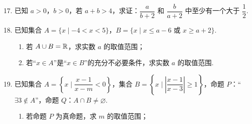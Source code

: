 \documentclass[a4paper,11pt]{article}
\begin{document}
\begin{enumerate}
\setcounter{enumi}{16}

\item 已知 $a>0$，$b>0$，若 $a+b>4$，求证：$\dfrac a{b+2}$ 和 $\dfrac b{a+2}$ 中至少有一个大于 $\dfrac12$.

\ifanswer
\solbegin
{}
\solend
\fi

\ansspace[6]

\item 已知集合 $A=\{x\mid-4<x<5\}$，$B=\{x\mid x\leqslant a-6\text{ 或 }x\geqslant a+2\}$.

\begin{enumerate}[label=(\arabic*)]

\item 若 $A\cup B=\mathbb{R}$，求实数 $a$ 的取值范围；

\item 若“$x\in A$”是“$x\in B$”的充分不必要条件，求实数 $a$ 的取值范围.

\end{enumerate}

\ifanswer
\solbegin
{}
\solend
\fi

\ansspace[8]

\item 已知集合 $A=\left\{x\mid\dfrac{x-1}{x-m}<0\right\}$，集合 $B=\left\{x\mid\left|\dfrac{x-1}{x-3}\right|\geqslant1\right\}$，命题 $P$：“$\exists3\notin A$”，命题
$Q$：$A\cap B\neq\varnothing$.

\begin{enumerate}[label=(\arabic*)]

\item 若命题 $P$ 为真命题，求 $m$ 的取值范围；


\end{enumerate}
\end{enumerate}
\end{document}
